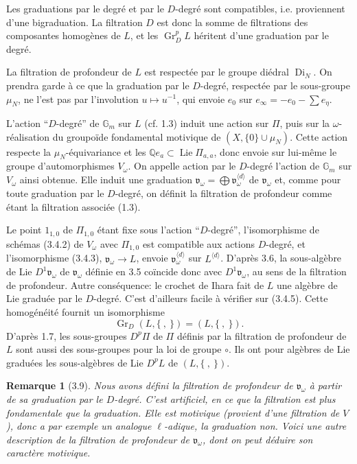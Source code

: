 \documentclass[10pt,a4paper]{article}
\newcommand{\Gm}{\mathbb G_m}
\newcommand{\muN}{\mu_N}
\newcommand{\Q}{\mathbb Q}
\newcommand{\Lie}{\operatorname{Lie}}
\newcommand{\Gr}{\operatorname{Gr}}
\newcommand{\vomega}{\mathfrak v_\omega}
\theoremstyle{deligne}
\newtheorem*{remark*}{Remarque}
\newcommand{\heading}[1]{\vspace{0.65em}\noindent{\bfseries #1}\quad}
\begin{document}
Les graduations par le degré et par le \(D\)-degré sont compatibles, i.e. proviennent d'une bigraduation. La filtration \(D\) est donc la somme de filtrations des composantes homogènes de \(L\), et les \(\Gr_D^pL\) héritent d'une graduation par le degré.

La filtration de profondeur de \(L\) est respectée par le groupe diédral \(\operatorname{Di}_N\). On prendra garde à ce que la graduation par le \(D\)-degré, respectée par le sous-groupe \(\muN\), ne l'est pas par l'involution \(u\mapsto u^{-1}\), qui envoie \(e_0\) sur \(e_\infty=-e_0-\sum e_\eta\).

\heading{3.8.} L'action ``\(D\)-degré'' de \(\Gm\) sur \(L\) (cf. 1.3) induit une action sur \(\Pi\), puis sur la \(\omega\)-réalisation du groupoïde fondamental motivique de \((X,\{0\}\cup\muN)\). Cette action respecte la \(\muN\)-équivariance et les \(\Q e_a\subset\Lie\Pi_{a,a}\), donc envoie sur lui-même le groupe d'automorphismes \(V_\omega\). On appelle action par le \(D\)-degré l'action de \(\Gm\) sur \(V_\omega\) ainsi obtenue. Elle induit une graduation \(\vomega=\bigoplus\vomega^{\langle d\rangle}\) de \(\vomega\) et, comme pour toute graduation par le \(D\)-degré, on définit la filtration de profondeur comme étant la filtration associée (1.3).

Le point \(1_{1,0}\) de \(\Pi_{1,0}\) étant fixe sous l'action ``\(D\)-degré'', l'isomorphisme de schémas (3.4.2) de \(V_\omega\) avec \(\Pi_{1,0}\) est compatible aux actions \(D\)-degré, et l'isomorphisme (3.4.3), \(\vomega\to L\), envoie \(\vomega^{\langle d\rangle}\) sur \(L^{\langle d\rangle}\). D'après 3.6, la sous-algèbre de Lie \(D^1\vomega\) de \(\vomega\) définie en 3.5 coïncide donc avec \(D^1\vomega\), au sens de la filtration de profondeur. Autre conséquence: le crochet de Ihara fait de \(L\) une algèbre de Lie graduée par le \(D\)-degré. C'est d'ailleurs facile à vérifier sur (3.4.5). Cette homogénéité fournit un isomorphisme
\[
\tag{3.8.1}
\Gr_D(L,\{\ ,\ \})=(L,\{\ ,\ \}).
\]
D'après 1.7, les sous-groupes \(D^p\Pi\) de \(\Pi\) définis par la filtration de profondeur de \(L\) sont aussi des sous-groupes pour la loi de groupe \(\circ\). Ils ont pour algèbres de Lie graduées les sous-algèbres de Lie \(D^pL\) de \((L,\{\ ,\ \})\).

\begin{remark*}[3.9]
Nous avons défini la filtration de profondeur de \(\vomega\) à partir de sa graduation par le \(D\)-degré. C'est artificiel, en ce que la filtration est plus fondamentale que la graduation. Elle est motivique (provient d'une filtration de \(V\)), donc a par exemple un analogue \(\ell\)-adique, la graduation non. Voici une autre description de la filtration de profondeur de \(\vomega\), dont on peut déduire son caractère motivique.
\end{remark*}
\end{document}
